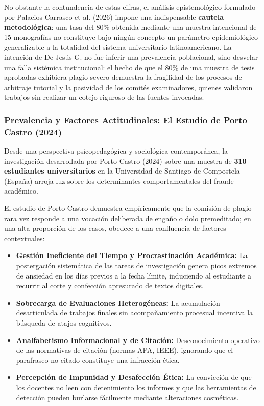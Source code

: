 No obstante la contundencia de estas cifras, el análisis epistemológico formulado por Palacios Carrasco et al. (2026) impone una indispensable \textbf{cautela metodológica}: una tasa del 80\% obtenida mediante una muestra intencional de 15 monografías no constituye bajo ningún concepto un parámetro epidemiológico generalizable a la totalidad del sistema universitario latinoamericano. La intención de De Jesús G. no fue inferir una prevalencia poblacional, sino desvelar una falla sistémica institucional: el hecho de que el 80\% de una muestra de tesis aprobadas exhibiera plagio severo demuestra la fragilidad de los procesos de arbitraje tutorial y la pasividad de los comités examinadores, quienes validaron trabajos sin realizar un cotejo riguroso de las fuentes invocadas.

\subsubsection{Prevalencia y Factores Actitudinales: El Estudio de Porto Castro (2024)}

Desde una perspectiva psicopedagógica y sociológica contemporánea, la investigación desarrollada por Porto Castro (2024) sobre una muestra de \textbf{310 estudiantes universitarios} en la Universidad de Santiago de Compostela (España) arroja luz sobre los determinantes comportamentales del fraude académico.

El estudio de Porto Castro demuestra empíricamente que la comisión de plagio rara vez responde a una vocación deliberada de engaño o dolo premeditado; en una alta proporción de los casos, obedece a una confluencia de factores contextuales:
\begin{itemize}
    \item \textbf{Gestión Ineficiente del Tiempo y Procrastinación Académica:} La postergación sistemática de las tareas de investigación genera picos extremos de ansiedad en los días previos a la fecha límite, induciendo al estudiante a recurrir al corte y confección apresurado de textos digitales.
    \item \textbf{Sobrecarga de Evaluaciones Heterogéneas:} La acumulación desarticulada de trabajos finales sin acompañamiento procesual incentiva la búsqueda de atajos cognitivos.
    \item \textbf{Analfabetismo Informacional y de Citación:} Desconocimiento operativo de las normativas de citación (normas APA, IEEE), ignorando que el parafraseo no citado constituye una infracción ética.
    \item \textbf{Percepción de Impunidad y Desafección Ética:} La convicción de que los docentes no leen con detenimiento los informes y que las herramientas de detección pueden burlarse fácilmente mediante alteraciones cosméticas.
\end{itemize}

